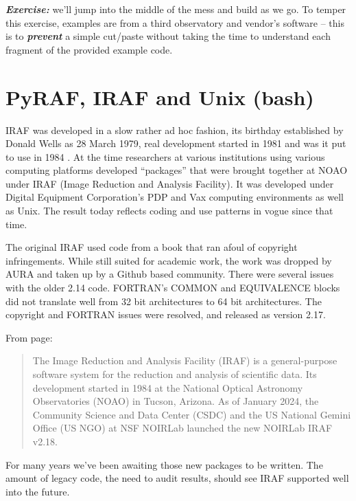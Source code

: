 \textbf{\emph{Exercise:}} we'll jump into the middle of the mess and
build as we go. To temper this exercise, examples are from a third
observatory and vendor's software -- this is to
\textbf{\emph{prevent}} a simple cut/paste without taking the time to
understand each fragment of the provided example code.



\section{PyRAF, IRAF and Unix (bash)}

IRAF was developed in a slow rather ad hoc fashion, its birthday
established by Donald Wells \cite{FITSBirthday} as 28 March 1979,
real development started in 1981 and was it put to use in 1984
\cite{1993ASPC...52..173T}.  At the time researchers at various
institutions using various computing platforms developed ``packages''
that were brought together at NOAO under IRAF (Image Reduction and
Analysis Facility). It was developed under Digital Equipment
Corporation's PDP and Vax computing environments as well as Unix. The
result today reflects coding and use patterns in vogue since that
time. 

The original IRAF used code from a book that ran afoul of copyright
infringements. While still suited for academic work, the work
was dropped by AURA and taken up by a Github based community. There
were several issues with the older 2.14 code. FORTRAN's COMMON and
EQUIVALENCE blocks did not translate well from 32 bit architectures
to 64 bit architectures. The copyright and FORTRAN issues were resolved,
and released as version 2.17.

\clearpage
From \cite{NOIRLabReleaseNote} page:

\begin{quote}
The Image Reduction and Analysis Facility (IRAF) is a general-purpose
software system for the reduction and analysis of scientific data. Its
development started in 1984 at the National Optical Astronomy
Observatories (NOAO) in Tucson, Arizona. As of January 2024, the
Community Science and Data Center (CSDC) and the US National Gemini
Office (US NGO) at NSF NOIRLab launched the new NOIRLab IRAF v2.18.
\end{quote}

For many years we've been awaiting those new packages to be written.
The amount of legacy code, the need to audit results, should see
IRAF supported well into the future.

